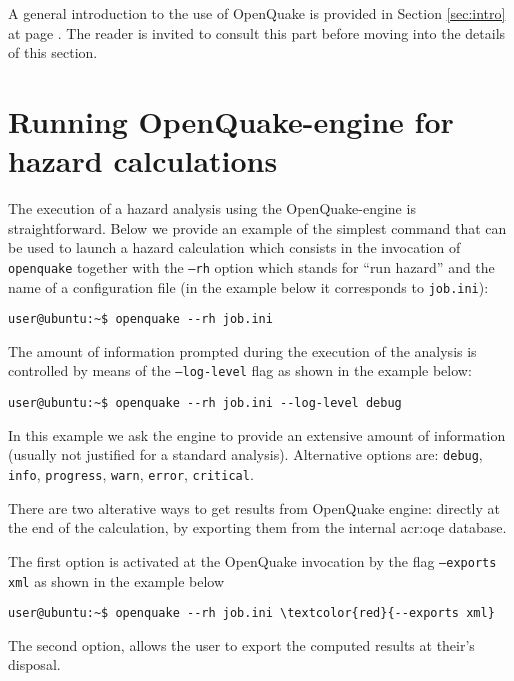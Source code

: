 A general introduction to the use of OpenQuake is provided in Section 
\ref{sec:intro} at page \pageref{sec:intro}.
The reader is invited to consult this part before moving into
the details of this section.
\section{Running OpenQuake-engine for hazard calculations}
The execution of a hazard analysis using the OpenQuake-engine 
is straightforward. Below we provide an example of the simplest 
command that can be used to launch a hazard calculation which 
consists in the invocation of \texttt{openquake} together with 
the \texttt{--rh} option which stands for ``run hazard'' and 
the name of a configuration file (in the example below
it corresponds to \texttt{job.ini}):
\begin{Verbatim}[frame=single, commandchars=\\\{\}, fontsize=\small]
user@ubuntu:~$ openquake --rh job.ini
\end{Verbatim}

The amount of information prompted during the execution of the 
analysis is controlled by means of the \texttt{--log-level} flag 
as shown in the example below:
\begin{Verbatim}[frame=single, commandchars=\\\{\}, fontsize=\small]
user@ubuntu:~$ openquake --rh job.ini --log-level debug
\end{Verbatim}
In this example we ask the engine to provide an extensive amount
of information (usually not justified for a standard analysis). 
Alternative options are: \texttt{debug}, \texttt{info}, \texttt{progress},
\texttt{warn}, \texttt{error}, \texttt{critical}.

There are two alterative ways to get results from OpenQuake engine:
directly at the end of the calculation, by exporting them from the 
internal \gls{acr:oqe} database. 

The first option is activated at the OpenQuake invocation by the flag 
\texttt{--exports xml} as shown in the example below
\begin{Verbatim}[frame=single, commandchars=\\\{\}, fontsize=\small]
user@ubuntu:~$ openquake --rh job.ini \textcolor{red}{--exports xml}
\end{Verbatim}
The second option, allows the user to export the computed results at 
their's disposal.

